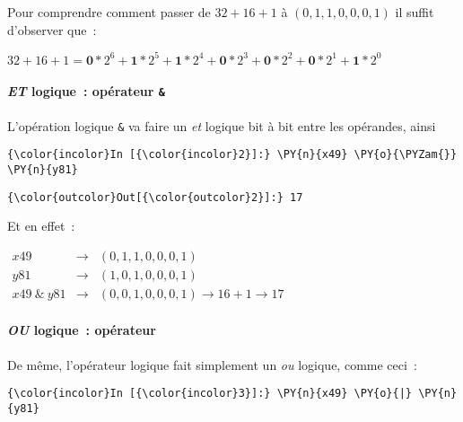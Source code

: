     Pour comprendre comment passer de \(32 + 16 + 1\) à \((0,1,1,0,0,0,1)\)
il suffit d'observer que~:

\(32 + 16 + 1 = \textbf{0}*2^6 + \textbf{1}*2^5 + \textbf{1}*2^4 + \textbf{0}*2^3 + \textbf{0}*2^2 + \textbf{0}*2^1 + \textbf{1}*2^0\)

    \hypertarget{et-logique-opuxe9rateur}{%
\paragraph{\texorpdfstring{\emph{ET} logique~: opérateur
\texttt{\&}}{ET logique~: opérateur \&}}\label{et-logique-opuxe9rateur}}

    L'opération logique \texttt{\&} va faire un \emph{et} logique bit à bit
entre les opérandes, ainsi

    \begin{Verbatim}[commandchars=\\\{\},frame=single,framerule=0.3mm,rulecolor=\color{cellframecolor}]
{\color{incolor}In [{\color{incolor}2}]:} \PY{n}{x49} \PY{o}{\PYZam{}} \PY{n}{y81}
\end{Verbatim}


\begin{Verbatim}[commandchars=\\\{\},frame=single,framerule=0.3mm,rulecolor=\color{cellframecolor}]
{\color{outcolor}Out[{\color{outcolor}2}]:} 17
\end{Verbatim}
            
    Et en effet~:

\(\begin{array}{rcl} x49 & \rightarrow & (0,1,1,0,0,0,1) \\ y81 & \rightarrow & (1,0,1,0,0,0,1) \\ x49\ \&\ y81 & \rightarrow & (0,0,1,0,0,0,1) \rightarrow 16 + 1 \rightarrow 17 \end{array}\)

    \hypertarget{ou-logique-opuxe9rateur}{%
\paragraph{\texorpdfstring{\emph{OU} logique~: opérateur
\texttt{\textbar{}}}{OU logique~: opérateur \textbar{}}}\label{ou-logique-opuxe9rateur}}

    De même, l'opérateur logique \texttt{\textbar{}} fait simplement un
\emph{ou} logique, comme ceci~:

    \begin{Verbatim}[commandchars=\\\{\},frame=single,framerule=0.3mm,rulecolor=\color{cellframecolor}]
{\color{incolor}In [{\color{incolor}3}]:} \PY{n}{x49} \PY{o}{|} \PY{n}{y81}
\end{Verbatim}


